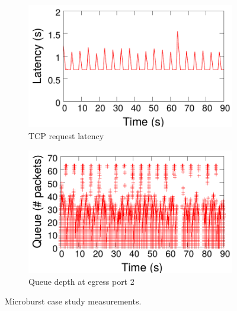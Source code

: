\begin{figure}[!t]
\centering
\begin{subfigure}[t]{0.48\columnwidth}
\raggedright
\includegraphics[width=\linewidth]{pq_fetch_latency.pdf}
\vspace{-0.2in}
\caption{TCP request latency}
\label{fig:mininet-latency}
\end{subfigure}
\begin{subfigure}[t]{0.48\columnwidth}
\raggedleft
\includegraphics[width=\linewidth]{pq_queue_sizes.pdf}
\vspace{-0.2in}
\caption{Queue depth at egress port 2}
\label{fig:mininet-qin}
\end{subfigure}
\vspace{-0.1in}
\caption{Microburst case study measurements.}
\end{figure}
